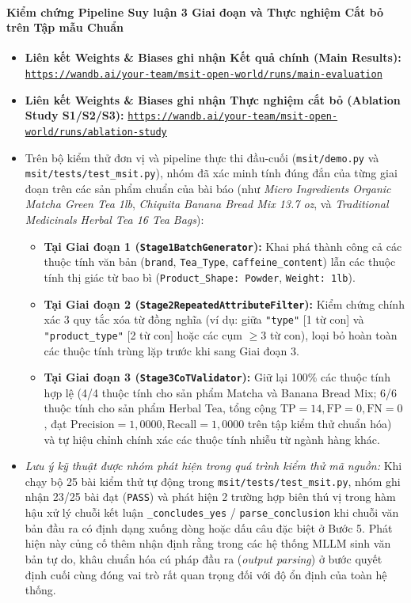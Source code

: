 \documentclass[conference,10pt]{IEEEtran}
\newcommand{\WandBMainEvalURL}{https://wandb.ai/your-team/msit-open-world/runs/main-evaluation}
\newcommand{\WandBAblationURL}{https://wandb.ai/your-team/msit-open-world/runs/ablation-study}
\begin{document}
\paragraph{Kiểm chứng Pipeline Suy luận 3 Giai đoạn và Thực nghiệm Cắt bỏ trên Tập mẫu Chuẩn}
\begin{itemize}
    \item \textbf{Liên kết Weights \& Biases ghi nhận Kết quả chính (Main Results):} \href{\WandBMainEvalURL}{\texttt{\WandBMainEvalURL}}
    \item \textbf{Liên kết Weights \& Biases ghi nhận Thực nghiệm cắt bỏ (Ablation Study S1/S2/S3):} \href{\WandBAblationURL}{\texttt{\WandBAblationURL}}
    \item Trên bộ kiểm thử đơn vị và pipeline thực thi đầu-cuối (\texttt{msit/demo.py} và \texttt{msit/tests/test\_msit.py}), nhóm đã xác minh tính đúng đắn của từng giai đoạn trên các sản phẩm chuẩn của bài báo (như \textit{Micro Ingredients Organic Matcha Green Tea 1lb}, \textit{Chiquita Banana Bread Mix 13.7 oz}, và \textit{Traditional Medicinals Herbal Tea 16 Tea Bags}):
    \begin{itemize}
        \item \textbf{Tại Giai đoạn 1 (\texttt{Stage1BatchGenerator}):} Khai phá thành công cả các thuộc tính văn bản (\texttt{brand}, \texttt{Tea\_Type}, \texttt{caffeine\_content}) lẫn các thuộc tính thị giác từ bao bì (\texttt{Product\_Shape: Powder}, \texttt{Weight: 1lb}).
        \item \textbf{Tại Giai đoạn 2 (\texttt{Stage2RepeatedAttributeFilter}):} Kiểm chứng chính xác 3 quy tắc xóa từ đồng nghĩa (ví dụ: giữa \texttt{"type"} [1 từ con] và \texttt{"product\_type"} [2 từ con] hoặc các cụm $\ge 3$ từ con), loại bỏ hoàn toàn các thuộc tính trùng lặp trước khi sang Giai đoạn 3.
        \item \textbf{Tại Giai đoạn 3 (\texttt{Stage3CoTValidator}):} Giữ lại 100\% các thuộc tính hợp lệ (4/4 thuộc tính cho sản phẩm Matcha và Banana Bread Mix; 6/6 thuộc tính cho sản phẩm Herbal Tea, tổng cộng $\text{TP} = 14, \text{FP} = 0, \text{FN} = 0$, đạt $\text{Precision} = 1,0000, \text{Recall} = 1,0000$ trên tập kiểm thử chuẩn hóa) và tự hiệu chỉnh chính xác các thuộc tính nhiễu từ ngành hàng khác.
    \end{itemize}
    \item \textit{Lưu ý kỹ thuật được nhóm phát hiện trong quá trình kiểm thử mã nguồn:} Khi chạy bộ 25 bài kiểm thử tự động trong \texttt{msit/tests/test\_msit.py}, nhóm ghi nhận 23/25 bài đạt (\texttt{PASS}) và phát hiện 2 trường hợp biên thú vị trong hàm hậu xử lý chuỗi kết luận \texttt{\_concludes\_yes} / \texttt{parse\_conclusion} khi chuỗi văn bản đầu ra có định dạng xuống dòng hoặc dấu câu đặc biệt ở Bước 5. Phát hiện này củng cố thêm nhận định rằng trong các hệ thống MLLM sinh văn bản tự do, khâu chuẩn hóa cú pháp đầu ra (\textit{output parsing}) ở bước quyết định cuối cùng đóng vai trò rất quan trọng đối với độ ổn định của toàn hệ thống.
\end{itemize}
\end{document}
